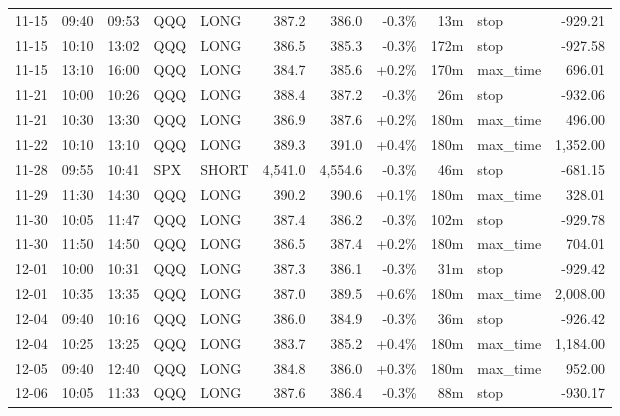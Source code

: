\documentclass[11pt,a4paper,twoside]{article}
\begin{document}
\begin{center}
\begin{longtable}{>{\color{txtmain}}l l l l l r r r r >{\color{txtmain}}l r}
11-15 & 09:40 & 09:53 & QQQ & LONG & 387.2 & 386.0 & \textcolor{lossred}{-0.3\%} & 13m & stop & \textcolor{lossred}{-929.21} \\
11-15 & 10:10 & 13:02 & QQQ & LONG & 386.5 & 385.3 & \textcolor{lossred}{-0.3\%} & 172m & stop & \textcolor{lossred}{-927.58} \\
11-15 & 13:10 & 16:00 & QQQ & LONG & 384.7 & 385.6 & \textcolor{wingreen}{+0.2\%} & 170m & max\_time & \textcolor{wingreen}{696.01} \\
11-21 & 10:00 & 10:26 & QQQ & LONG & 388.4 & 387.2 & \textcolor{lossred}{-0.3\%} & 26m & stop & \textcolor{lossred}{-932.06} \\
11-21 & 10:30 & 13:30 & QQQ & LONG & 386.9 & 387.6 & \textcolor{wingreen}{+0.2\%} & 180m & max\_time & \textcolor{wingreen}{496.00} \\
11-22 & 10:10 & 13:10 & QQQ & LONG & 389.3 & 391.0 & \textcolor{wingreen}{+0.4\%} & 180m & max\_time & \textcolor{wingreen}{1,352.00} \\
11-28 & 09:55 & 10:41 & SPX & SHORT & 4,541.0 & 4,554.6 & \textcolor{lossred}{-0.3\%} & 46m & stop & \textcolor{lossred}{-681.15} \\
11-29 & 11:30 & 14:30 & QQQ & LONG & 390.2 & 390.6 & \textcolor{wingreen}{+0.1\%} & 180m & max\_time & \textcolor{wingreen}{328.01} \\
11-30 & 10:05 & 11:47 & QQQ & LONG & 387.4 & 386.2 & \textcolor{lossred}{-0.3\%} & 102m & stop & \textcolor{lossred}{-929.78} \\
11-30 & 11:50 & 14:50 & QQQ & LONG & 386.5 & 387.4 & \textcolor{wingreen}{+0.2\%} & 180m & max\_time & \textcolor{wingreen}{704.01} \\
12-01 & 10:00 & 10:31 & QQQ & LONG & 387.3 & 386.1 & \textcolor{lossred}{-0.3\%} & 31m & stop & \textcolor{lossred}{-929.42} \\
12-01 & 10:35 & 13:35 & QQQ & LONG & 387.0 & 389.5 & \textcolor{wingreen}{+0.6\%} & 180m & max\_time & \textcolor{wingreen}{2,008.00} \\
12-04 & 09:40 & 10:16 & QQQ & LONG & 386.0 & 384.9 & \textcolor{lossred}{-0.3\%} & 36m & stop & \textcolor{lossred}{-926.42} \\
12-04 & 10:25 & 13:25 & QQQ & LONG & 383.7 & 385.2 & \textcolor{wingreen}{+0.4\%} & 180m & max\_time & \textcolor{wingreen}{1,184.00} \\
12-05 & 09:40 & 12:40 & QQQ & LONG & 384.8 & 386.0 & \textcolor{wingreen}{+0.3\%} & 180m & max\_time & \textcolor{wingreen}{952.00} \\
12-06 & 10:05 & 11:33 & QQQ & LONG & 387.6 & 386.4 & \textcolor{lossred}{-0.3\%} & 88m & stop & \textcolor{lossred}{-930.17} \\

\end{longtable}
\end{center}
\end{document}
